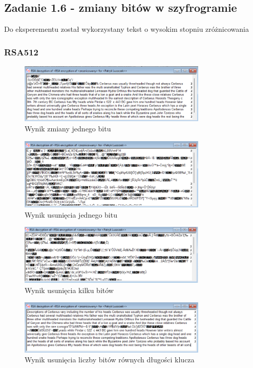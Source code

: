 \documentclass{article}
\begin{document}
\subsection{Zadanie 1.6 - zmiany bitów w szyfrogramie}
Do eksperementu został wykorzystany tekst o wysokim stopniu zróżnicowania
\subsubsection{RSA512}
\begin{figure}[H]
    \centering
    \includegraphics[width=0.8\textwidth]{zmiana_512.png}
    \caption{Wynik zmiany jednego bitu}
\end{figure}
\begin{figure}[H]
    \centering
    \includegraphics[width=0.8\textwidth]{usun1_512.png}
    \caption{Wynik usunięcia jednego bitu}
\end{figure}
\begin{figure}[H]
    \centering
    \includegraphics[width=0.8\textwidth]{usunkilka_512.png}
    \caption{Wynik usunięcia kilku bitów}
\end{figure}
\begin{figure}[H]
    \centering
    \includegraphics[width=0.8\textwidth]{usunklucz_512.png}
    \caption{Wynik usunięcia liczby bitów równych długości klucza}
\end{figure}
\end{document}
